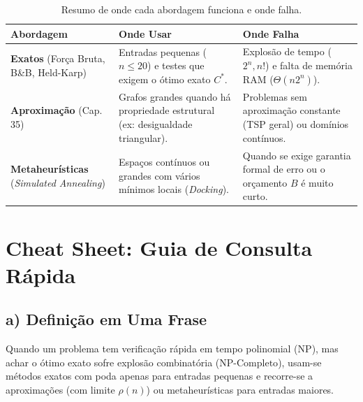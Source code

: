 \documentclass[conference]{IEEEtran}
\theoremstyle{definition}
\theoremstyle{plain}
\begin{document}
\begin{table}[htbp]
\centering
\caption{Resumo de onde cada abordagem funciona e onde falha.}
\label{tab:resumo_aplicabilidade}
\footnotesize
\begin{tabular}{@{}p{2.0cm}p{3.0cm}p{3.0cm}@{}}
\toprule
\textbf{Abordagem} & \textbf{Onde Usar} & \textbf{Onde Falha} \\
\midrule
\textbf{Exatos} (Força Bruta, B\&B, Held-Karp) & Entradas pequenas ($n \le 20$) e testes que exigem o ótimo exato $C^*$. & Explosão de tempo ($2^n, n!$) e falta de memória RAM ($\Theta(n 2^n)$). \\[0.1cm]
\textbf{Aproximação} (Cap. 35) & Grafos grandes quando há propriedade estrutural (ex: desigualdade triangular). & Problemas sem aproximação constante (TSP geral) ou domínios contínuos. \\[0.1cm]
\textbf{Metaheurísticas} (\textit{Simulated Annealing}) & Espaços contínuos ou grandes com vários mínimos locais (\textit{Docking}). & Quando se exige garantia formal de erro ou o orçamento $B$ é muito curto. \\
\bottomrule
\end{tabular}
\end{table}




\appendices
\section{Cheat Sheet: Guia de Consulta Rápida}
\label{ap:cheatsheet}

\subsection*{a) Definição em Uma Frase}
Quando um problema tem verificação rápida em tempo polinomial ($\text{NP}$), mas achar o ótimo exato sofre explosão combinatória ($\text{NP-Completo}$), usam-se métodos exatos com poda apenas para entradas pequenas e recorre-se a aproximações (com limite $\rho(n)$) ou metaheurísticas para entradas maiores.
\end{document}
